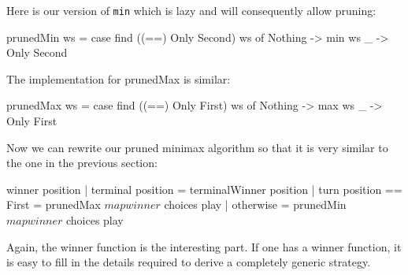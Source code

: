 Here is our version of \texttt{min} which is lazy and will consequently allow pruning:
\begin{code}
  prunedMin ws = 
    case find ((==) Only Second) ws of
      Nothing -> min ws
      _ -> Only Second
\end{code}
The implementation for prunedMax is similar:
\begin{code}
  prunedMax ws = 
    case find ((==) Only First) ws of
      Nothing -> max ws
      _ -> Only First
\end{code}
Now we can rewrite our pruned minimax algorithm so that it is very similar to the one in the previous section:

\begin{code}
  winner position
    | terminal position       = terminalWinner position
    | turn position == First  = prunedMax $ map winner $ choices play
    | otherwise               = prunedMin $ map winner $ choices play
\end{code}
Again, the winner function is the interesting part. If one has a winner function, it is easy to fill in the details required to derive a completely generic strategy.
